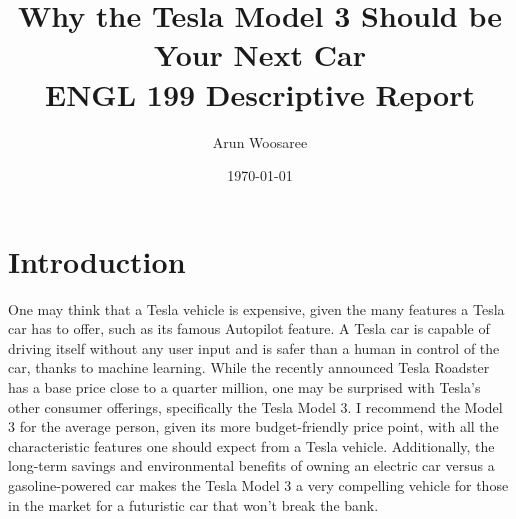 \documentclass{IEEEtran}
\title{Why the Tesla Model 3 Should be Your Next Car\\
\vspace{.25cm}\large ENGL 199 Descriptive Report \vspace{-.5cm}}
\author{\LARGE Arun Woosaree}
\date{\today}
\begin{document}
  \maketitle %

  \section{Introduction}

  One may think that a Tesla vehicle is expensive, given the many
  features a Tesla car has to offer, such as its famous Autopilot feature. A Tesla car
  is capable of driving itself without any user input and is safer than a human
  in control of the car, thanks to machine learning.\cite{safer} While the recently announced
  Tesla Roadster has a base price close to a quarter million\cite{teslaroadster}, one may be
  surprised with Tesla's other consumer offerings, specifically the Tesla Model 3.
  I recommend the Model 3 for the average person, given its more budget-friendly
  price point, with all the characteristic features one should expect from a Tesla
  vehicle. Additionally, the long-term savings and environmental benefits of owning
  an electric car versus a gasoline-powered car makes the Tesla Model 3 a very compelling
  vehicle for those in the market for a futuristic car that won't break the bank.
\end{document}

